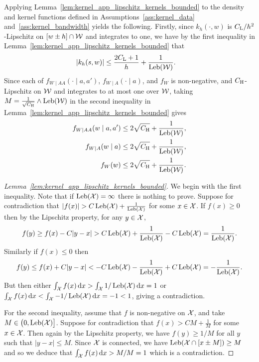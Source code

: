 Applying Lemma~\ref{lem:kernel_app_lipschitz_kernels_bounded}
to the density and kernel functions defined in
Assumptions~\ref{ass:kernel_data} and~\ref{ass:kernel_bandwidth}
yields the following.
Firstly, since $k_h(\cdot, w)$ is $C_{\mathrm{L}} / h^2$-Lipschitz
on $[w \pm h] \cap \mathcal{W}$ and integrates to one,
we have by the first inequality in
Lemma~\ref{lem:kernel_app_lipschitz_kernels_bounded} that
\begin{align*}
  |k_h(s,w)|
  &\leq \frac{2 C_{\mathrm{L}} + 1}{h} + \frac{1}{\operatorname{Leb}(\mathcal{W})}.
\end{align*}
Since each of
$f_{W \mid AA}(\cdot \mid a,a')$,
$f_{W \mid A}(\cdot \mid a)$, and
$f_W$ is non-negative, and $C_{\mathrm{H}}$-Lipschitz on $\mathcal{W}$
and integrates to at most one over $\mathcal{W}$,
taking $M = \frac{1}{\sqrt{C_{\mathrm{H}}}} \wedge \operatorname{Leb}(\mathcal{W})$
in the second inequality in
Lemma~\ref{lem:kernel_app_lipschitz_kernels_bounded}
gives
\begin{align*}
  f_{W \mid AA}(w \mid a,a')
  &\leq 2 \sqrt{C_{\mathrm{H}}} + \frac{1}{\operatorname{Leb}(\mathcal{W})}, \\
  f_{W \mid A}(w \mid a)
  &\leq 2 \sqrt{C_{\mathrm{H}}} + \frac{1}{\operatorname{Leb}(\mathcal{W})}, \\
  f_W(w)
  &\leq 2 \sqrt{C_{\mathrm{H}}} + \frac{1}{\operatorname{Leb}(\mathcal{W})}.
\end{align*}

\begin{proof}[Lemma~\ref{lem:kernel_app_lipschitz_kernels_bounded}]

  We begin with the first inequality.
  Note that if $\operatorname{Leb}(\mathcal{X}) = \infty$ there is nothing to prove.
  Suppose for contradiction that
  $|f(x)| > C \operatorname{Leb}(\mathcal{X}) + \frac{1}{\operatorname{Leb}(\mathcal{X})}$
  for some $x \in \mathcal{X}$.
  If $f(x) \geq 0$
  then by the Lipschitz property, for any $y \in \mathcal{X}$,
  \begin{align*}
    f(y)
    \geq f(x) - C|y-x|
    > C \operatorname{Leb}(\mathcal{X}) + \frac{1}{\operatorname{Leb}(\mathcal{X})} - C\operatorname{Leb}(\mathcal{X})
    = \frac{1}{\operatorname{Leb}(\mathcal{X})}.
  \end{align*}
  Similarly if $f(x) \leq 0$ then
  \begin{align*}
    f(y)
    \leq f(x) + C|y-x|
    < - C \operatorname{Leb}(\mathcal{X}) - \frac{1}{\operatorname{Leb}(\mathcal{X})} + C\operatorname{Leb}(\mathcal{X})
    = -\frac{1}{\operatorname{Leb}(\mathcal{X})}.
  \end{align*}
  But then either
  $\int_{\mathcal{X}} f(x) \,\mathrm{d}x > \int_{\mathcal{X}} 1/\operatorname{Leb}(\mathcal{X}) \,\mathrm{d}x = 1$
  or
  $\int_{\mathcal{X}} f(x) \,\mathrm{d}x < \int_{\mathcal{X}} -1/\operatorname{Leb}(\mathcal{X}) \,\mathrm{d}x = -1 < 1$,
  giving a contradiction.

  For the second inequality,
  assume that $f$ is non-negative on $\mathcal{X}$,
  and take $M \in \big(0, \operatorname{Leb}(\mathcal{X})\big]$.
  Suppose for contradiction that
  $f(x) > C M + \frac{1}{M}$
  for some $x \in \mathcal{X}$.
  Then again by the Lipschitz property,
  we have $f(y) \geq 1/M$
  for all $y$ such that $|y - x| \leq M$.
  Since $\mathcal{X}$ is connected, we have
  $\operatorname{Leb}(\mathcal{X} \cap [x \pm M]) \geq M$
  and so we deduce that
  $\int_{\mathcal{X}} f(x) \,\mathrm{d}x > M/M = 1$
  which is a contradiction.
\end{proof}

